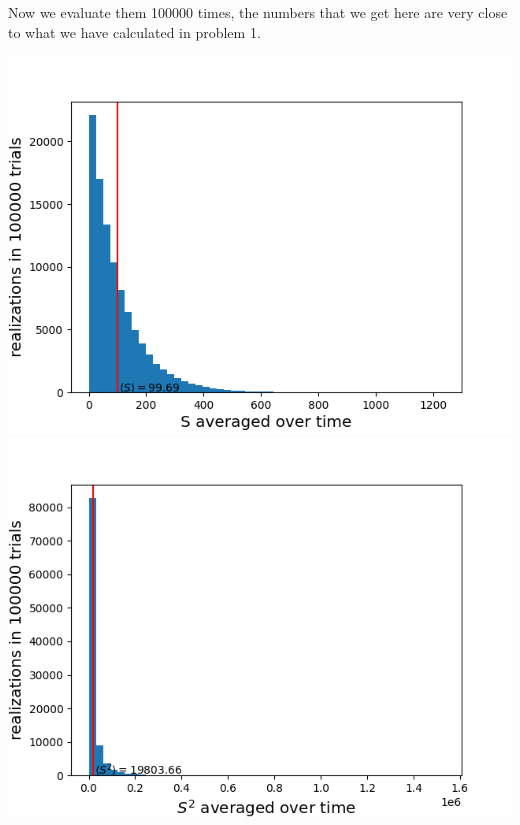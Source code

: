 \documentclass[11pt, oneside]{book}
\theoremstyle{break}
\theoremstyle{break}
\begin{document}
\newpage
Now we evaluate them 100000 times, the numbers that we get here are very close to what we have calculated in problem 1. 
\begin{center}
\includegraphics[scale=0.65]{542HW9/P2More}
\includegraphics[scale=0.65]{542HW9/P2S2More}
\end{center}
\end{document}
